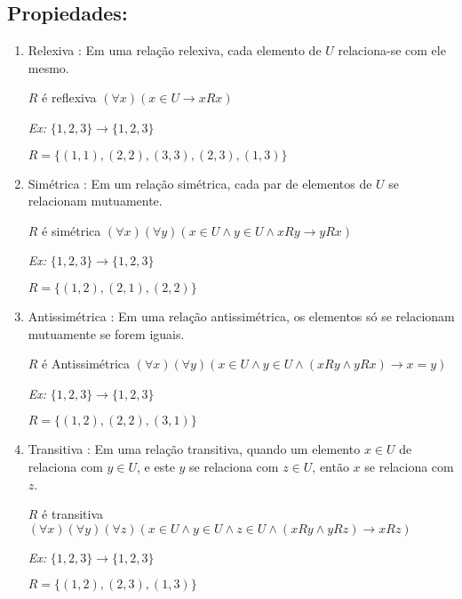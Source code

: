 \subsection{Propiedades:}
     \begin{enumerate}
        \item Relexiva : Em uma relação relexiva, cada elemento de $U$ relaciona-se com ele mesmo.
        
        $R$ é reflexiva \Leftrightarrow $(\forall x)(x  \in  U \rightarrow xRx)$ 
        
        \textit{Ex:} $\{1,2,3\} \rightarrow  \{1,2,3\}$
        
        $R = \{(1,1),(2,2),(3,3),(2,3),(1,3)\}$
        
        \item Simétrica : Em um relação simétrica, cada par de elementos de $U$ se relacionam mutuamente.
        
        $R$ é simétrica \Leftrightarrow $(\forall x)( \forall  y)(x \in U \wedge y \in U \wedge xRy  \rightarrow  yRx)$
        
        \textit{Ex:} $\{1,2,3\} \rightarrow  \{1,2,3\}$
        
        $R = \{(1,2),(2,1),(2,2)\}$
        
        
        \item Antissimétrica : Em uma relação antissimétrica, os elementos só se relacionam mutuamente se forem iguais.
        
        $R$ é Antissimétrica \Leftrightarrow $(\forall x)( \forall  y)(x \in U \wedge y \in U \wedge (xRy  \wedge yRx) \rightarrow x=y)$
        
        \textit{Ex:} $\{1,2,3\} \rightarrow  \{1,2,3\}$
        
        $R = \{(1,2),(2,2),(3,1)\}$
        
        \item Transitiva : Em uma relação transitiva, quando um elemento $x\in U$ de relaciona com  $y\in U$, e este $y$ se relaciona com $z \in U$, então $x$ se relaciona com $z$.
        
        $R$ é transitiva \Leftrightarrow $( \forall x)( \forall  y)( \forall z)(x \in U \wedge y \in U \wedge z \in U \wedge   (xRy  \wedge yRz) \rightarrow xRz)$
        
        \textit{Ex:} $\{1,2,3\} \rightarrow  \{1,2,3\}$
        
        $R = \{(1,2),(2,3),(1,3)\}$
        
        
     \end{enumerate}

